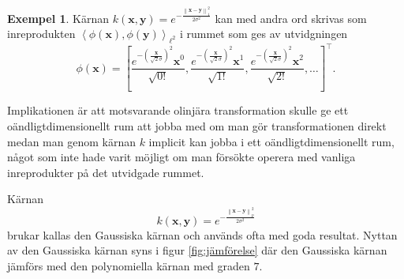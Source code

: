 \documentclass[a4paper, 12pt]{report}
\theoremstyle{definition}
\newtheorem{ex}{Exempel}[section]
\theoremstyle{remark}
\newcommand{\bfx}{\mathbf{x}}
\newcommand{\bfy}{\mathbf{y}}
\newcommand{\llangle}{\left\langle}
\newcommand{\rrangle}{\right\rangle}
\newcommand{\inner}[2]{\llangle #1, #2 \rrangle}
\begin{document}
\begin{ex}
	Kärnan $k\left(\bfx, \bfy\right)=e^{-\frac{\left\| \bfx-\bfy\right\|_1^2}{2\sigma^2}}$ kan med andra ord skrivas som inreprodukten $\inner{\phi\left(\bfx\right)}{\phi\left(\bfy\right)}_{\ell^2}$ i rummet som ges av utvidgningen
	\begin{equation*}
	\phi\left(\bfx\right)=\left[\frac{e^{-\left(\frac{\bfx}{\sqrt{2}\sigma}\right)^2} \bfx^0}{\sqrt{0!}}, \frac{e^{-\left(\frac{\bfx}{\sqrt{2}\sigma}\right)^2} \bfx^1}{\sqrt{1!}}, \frac{e^{-\left(\frac{\bfx}{\sqrt{2}\sigma}\right)^2} \bfx^2}{\sqrt{2!}}, \dots\right]^\intercal.
	\end{equation*}

	Implikationen är att motsvarande olinjära transformation skulle ge ett oändligtdimensionellt rum att jobba med om man gör transformationen direkt medan man genom kärnan $k$ implicit kan jobba i ett oändligtdimensionellt rum, något som inte hade varit möjligt om man försökte operera med vanliga inreprodukter på det utvidgade rummet.
	
	Kärnan \begin{equation*}
	k\left(\bfx, \bfy\right)=e^{-\frac{\left\| \bfx-\bfy\right\|_p^2}{2\sigma^2}}
	\end{equation*} brukar kallas den Gaussiska kärnan och används ofta med goda resultat.
	Nyttan av den Gaussiska kärnan syns i figur \ref{fig:jämförelse} där den Gaussiska kärnan jämförs med den polynomiella kärnan med graden $7$.
\end{ex}
\end{document}
